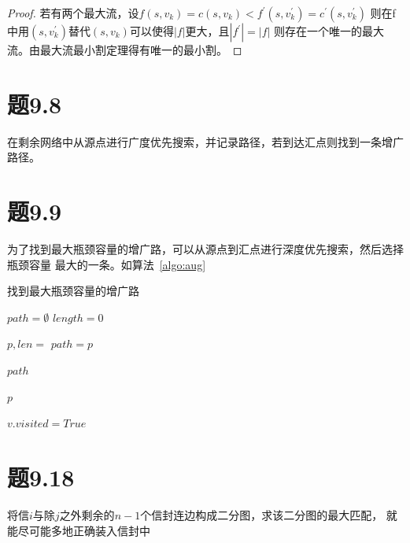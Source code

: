 \documentclass[a4paper,twoside]{article}
\begin{document}
\begin{spacing}{1.2}
\begin{proof}
	若有两个最大流，设$f(s,v_k)=c(s,v_k)<f^{'}(s,v_k^{'})=c^{'}(s,v_k^{'})$
	则在f中用$(s,v_k^{'})$替代$(s,v_k)$可以使得$|f|$更大，且$|f^{'}|=|f|$
	则存在一个唯一的最大流。由最大流最小割定理得有唯一的最小割。
\end{proof}

\section{题9.8}

在剩余网络中从源点进行广度优先搜索，并记录路径，若到达汇点则找到一条增广路径。

\section{题9.9}

为了找到最大瓶颈容量的增广路，可以从源点到汇点进行深度优先搜索，然后选择瓶颈容量
最大的一条。如算法~\ref{algo:aug}

\begin{algorithm}
	\caption{找到最大瓶颈容量的增广路}
	\label{algo:aug}
	\begin{algorithmic}[1]

		\State $path=\emptyset$
		\State $length=0$

				\State $p,len=$ 
					\State $path=p$
				\EndIf
			\EndFor
		\EndFor

		\State \Return $path$
		
		\EndProcedure

				\State \Return $p$
			\EndIf

					\State $v.visited=True$
					\State \Return {}
				\EndIf
			\EndFor
		\EndProcedure
	\end{algorithmic}
\end{algorithm}	

\section{题9.18}

将信$i$与除$j$之外剩余的$n-1$个信封连边构成二分图，求该二分图的最大匹配，
就能尽可能多地正确装入信封中


\end{spacing}
\end{document}
